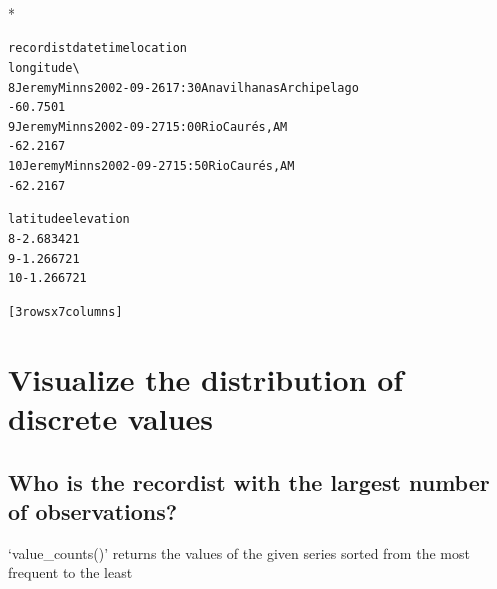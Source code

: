 \documentclass[letterpaper,10pt,english]{/usr/share/sphinx/texinputs/sphinxhowto}
\def\smaller{\fontsize{9.5pt}{9.5pt}\selectfont}
\newenvironment{InvisibleVerbatim}
        {\begin{mdframed}[leftmargin=0.1\linewidth,innerleftmargin=3pt,innerrightmargin=3pt, userdefinedwidth=1\linewidth, linewidth=0pt, linecolor=white, usetwoside=false]}
        {\end{mdframed}}
\begin{document}
                \makebox[0.1\linewidth]{\smaller\hfill\tt\color{nbframe-out-prompt}Out\hspace{4pt}{[}31{]}:\hspace{4pt}}\\*
                \vspace{-2.55\baselineskip}\begin{InvisibleVerbatim}
                \vspace{-0.5\baselineskip}
\begin{alltt}       recordist        date   time                 location
longitude  \textbackslash{}
8   Jeremy Minns  2002-09-26  17:30  Anavilhanas Archipelago
-60.7501
9   Jeremy Minns  2002-09-27  15:00           Rio Caurés, AM
-62.2167
10  Jeremy Minns  2002-09-27  15:50           Rio Caurés, AM
-62.2167

    latitude elevation
8    -2.6834        21
9    -1.2667        21
10   -1.2667        21

[3 rows x 7 columns]\end{alltt}

            \end{InvisibleVerbatim}
            
        
    
\section{Visualize the distribution of discrete values}\subsection{Who is the recordist with the largest number of observations?}`value\_counts()' returns the values of the given series sorted from the
most frequent to the least

\end{document}
